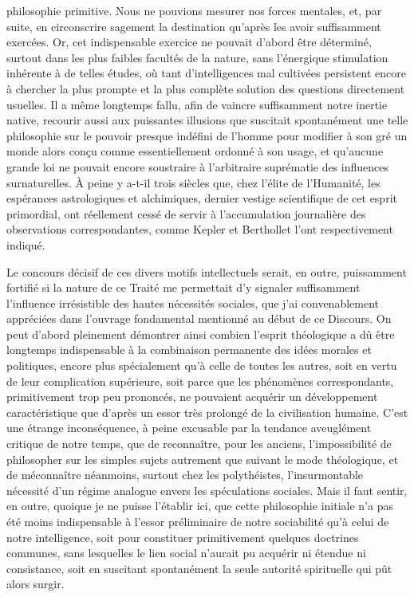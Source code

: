 \documentclass[french,twoside]{book} %
\begin{document}
philosophie primitive. Nous ne pouvions mesurer nos forces mentales, et, par suite, en circonscrire sagement la destination qu’après les avoir suffisamment exercées. Or, cet indispensable exercice ne pouvait d’abord être déterminé, surtout dans les plus faibles facultés de la nature, sans l’énergique stimulation inhérente à de telles études, où tant d’intelligences mal cultivées persistent encore à chercher la plus prompte et la plus complète solution des questions directement usuelles. Il a même longtemps fallu, afin de vaincre suffisamment notre inertie native, recourir aussi aux puissantes illusions que suscitait spontanément une telle philosophie sur le pouvoir presque indéfini de l’homme pour modifier à son gré un monde alors conçu comme essentiellement ordonné à son usage, et qu’aucune grande loi ne pouvait encore soustraire à l’arbitraire suprématie des influences surnaturelles. À peine y a-t-il trois siècles que, chez l’élite de l’Humanité, les espérances astrologiques et alchimiques, dernier vestige scientifique de cet esprit primordial, ont réellement cessé de servir à l’accumulation journalière des observations correspondantes, comme Kepler et Berthollet l’ont respectivement indiqué.\par
Le concours décisif de ces divers motifs intellectuels serait, en outre, puissamment fortifié si la nature de ce Traité me permettait d’y signaler suffisamment l’influence irrésistible des hautes nécessités sociales, que j’ai convenablement appréciées dans l’ouvrage fondamental mentionné au début de ce Discours. On peut d’abord pleinement démontrer ainsi combien l’esprit théologique a dû être longtemps indispensable à la combinaison permanente des idées morales et politiques, encore plus spécialement qu’à celle de toutes les autres, soit en vertu de leur complication supérieure, soit parce que les phénomènes correspondants, primitivement trop peu prononcés, ne pouvaient acquérir un développement caractéristique que d’après un essor très prolongé de la civilisation humaine. C’est une étrange inconséquence, à peine excusable par la tendance aveuglément critique de notre temps, que de reconnaître, pour les anciens, l’impossibilité de philosopher sur les simples sujets autrement que suivant le mode théologique, et de méconnaître néanmoins, surtout chez les polythéistes, l’insurmontable nécessité d’un régime analogue envers les spéculations sociales. Mais il faut sentir, en outre, quoique je ne puisse l’établir ici, que cette philosophie initiale n’a pas été moins indispensable à l’essor préliminaire de notre sociabilité qu’à celui de notre intelligence, soit pour constituer primitivement quelques doctrines communes, sans lesquelles le lien social n’aurait pu acquérir ni étendue ni consistance, soit en suscitant spontanément la seule autorité spirituelle qui pût alors surgir.\par
\end{document}
